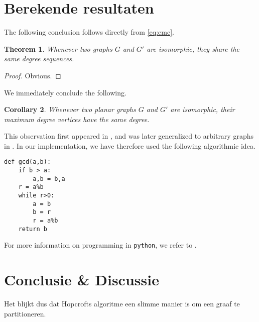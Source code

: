 \documentclass[twoside]{article}
\newtheorem{theorem}{Theorem}[section]
\newtheorem{corollary}[theorem]{Corollary}
\begin{document}
\begin{multicols}{2}
\section{Berekende resultaten}

The following conclusion follows directly from \eqref{eq:emc}.
\lipsum[6] %
\begin{theorem}
Whenever two graphs $G$ and $G'$ are isomorphic, they share the same degree sequences.
\end{theorem}
\begin{proof}
Obvious.
\end{proof}
We immediately conclude the following.
\begin{corollary}
Whenever two planar graphs $G$ and $G'$ are isomorphic, their maximum degree vertices have the same degree. 
\end{corollary}
This observation first appeared in , and was later generalized to arbitrary graphs in .
In our implementation, we have therefore used the following algorithmic idea.
\begin{verbatim}
def gcd(a,b):
    if b > a:
        a,b = b,a
    r = a%b
    while r>0:
        a = b
        b = r
        r = a%b
    return b
\end{verbatim}
For more information on programming in {\tt python}, we refer to\cite{jaco} \cite{MR0403320}.

\section{Conclusie \& Discussie}
Het blijkt dus dat Hopcrofts algoritme een slimme manier is om een graaf te partitioneren. 

\lipsum[8] %


 




\end{multicols}
\end{document}
